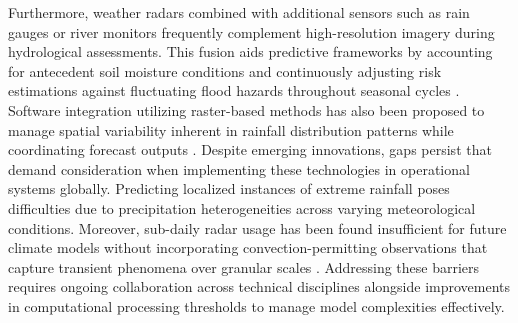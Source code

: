 Furthermore, weather radars combined with additional sensors such as rain gauges or river monitors frequently complement high-resolution imagery during hydrological assessments. This fusion aids predictive frameworks by accounting for antecedent soil moisture conditions and continuously adjusting risk estimations against fluctuating flood hazards throughout seasonal cycles \citep{Msigwa2024}\citep{Abegaz2024}\citep{Henao2022a}. Software integration utilizing raster-based methods has also been proposed to manage spatial variability inherent in rainfall distribution patterns while coordinating forecast outputs \citep{Henao2022}\citep{Henao2022a}.
Despite emerging innovations, gaps persist that demand consideration when implementing these technologies in operational systems globally. Predicting localized instances of extreme rainfall poses difficulties due to precipitation heterogeneities across varying meteorological conditions. Moreover, sub-daily radar usage has been found insufficient for future climate models without incorporating convection-permitting observations that capture transient phenomena over granular scales \citep{Dale2021}. Addressing these barriers requires ongoing collaboration across technical disciplines alongside improvements in computational processing thresholds to manage model complexities effectively.
